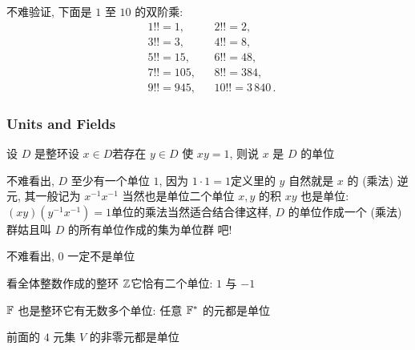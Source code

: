 \begin{example}
    不难验证, 下面是 $1$ 至 $10$ 的双阶乘:
    \begin{align*}
         & 1!! = 1,   &  & 2!! = 2,              \\
         & 3!! = 3,   &  & 4!! = 8,              \\
         & 5!! = 15,  &  & 6!! = 48,             \\
         & 7!! = 105, &  & 8!! = 384,            \\
         & 9!! = 945, &  & 10!! = 3\,840 \period
    \end{align*}
\end{example}

\subsubsection*{Units and Fields}

\begin{definition}
    设 $D$ 是整环\period 设 $x \in D$\period 若存在 $y \in D$ 使 $xy=1$, 则说 $x$ 是 $D$ 的单位 \period
\end{definition}

\begin{remark}
    不难看出, $D$ 至少有一个单位 $1$, 因为 $1 \cdot 1 = 1$\period 定义里的 $y$ 自然就是 $x$ 的 (乘法) 逆元, 其一般记为 $x^{-1}$\period $x^{-1}$ 当然也是单位\period 二个单位 $x,y$ 的积 $xy$ 也是单位: $(xy)(y^{-1}x^{-1})=1$\period 单位的乘法当然适合结合律\period 这样, $D$ 的单位作成一个 (乘法) 群\period 姑且叫 $D$ 的所有单位作成的集为单位群  吧!
\end{remark}

\begin{remark}
    不难看出, $0$ 一定不是单位\period
\end{remark}

\begin{example}
    看全体整数作成的整环 $\mathbb{Z}$\period 它恰有二个单位: $1$ 与 $-1$\period
\end{example}

\begin{example}
    $\mathbb{F}$ 也是整环\period 它有无数多个单位: 任意 $\mathbb{F}^{\ast}$ 的元都是单位\period
\end{example}

\begin{example}
    前面的 $4$ 元集 $V$ 的非零元都是单位\period
\end{example}

